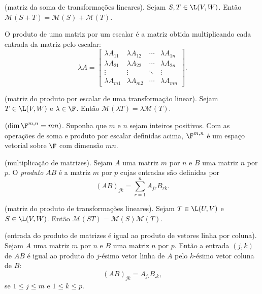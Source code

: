 \documentclass{article}
\begin{document}
\begin{prop} (matriz da soma de transformações lineares).
    Sejam \(S, T \in \L(V, W)\). Então \(\mathcal{M}(S + T) = \mathcal{M}(S) + \mathcal{M}(T)\).
\end{prop}

\begin{defn}
    O produto de uma matriz por um escalar é a matriz obtida multiplicando cada entrada da matriz pelo escalar:
    \[
        \lambda A = \begin{bmatrix}
            \lambda A_{11} & \lambda A_{12} & \cdots & \lambda A_{1n} \\
            \lambda A_{21} & \lambda A_{22} & \cdots & \lambda A_{2n} \\
            \vdots & \vdots & \ddots & \vdots \\
            \lambda A_{m1} & \lambda A_{m2} & \cdots & \lambda A_{mn}
        \end{bmatrix}.
    \]
\end{defn}

\begin{prop} (matriz do produto por escalar de uma transformação linear).
    Sejam \(T \in \L(V, W)\) e \(\lambda \in \F\). Então \(\mathcal{M}(\lambda T) = \lambda \mathcal{M}(T)\).
\end{prop}

\begin{prop} \((\dim \F^{m,n} = mn)\).
    Suponha que \(m\) e \(n\) sejam inteiros positivos. Com as operações de soma e produto por escalar definidas acima, \(\F^{m,n}\) é um espaço vetorial sobre \(\F\) com dimensão \(mn\).    
\end{prop}

\begin{defn} (multiplicação de matrizes).
    Sejam \(A\) uma matriz \(m\) por \(n\) e \(B\) uma matriz \(n\) por \(p\). O \emph{produto} \(AB\) é a matriz \(m\) por \(p\) cujas entradas são definidas por
    \[
        (AB)_{jk} = \sum_{r=1}^{n} A_{jr} B_{rk}.
    \]
\end{defn}

\begin{prop} (matriz do produto de transformações lineares).
    Sejam \(T \in \L(U, V)\) e \(S \in \L(V, W)\). Então \(\mathcal{M}(ST) = \mathcal{M}(S) \mathcal{M}(T)\).
\end{prop}

\begin{prop} (entrada do produto de matrizes é igual ao produto de vetores linha por coluna).
    Sejam \(A\) uma matriz \(m\) por \(n\) e \(B\) uma matriz \(n\) por \(p\). Então a entrada \((j, k)\) de \(AB\) é igual ao produto do \(j\)-ésimo vetor linha de \(A\) pelo \(k\)-ésimo vetor coluna de \(B\):
    \[
        (AB)_{jk} = A_{j.} B_{.k},
    \]
    \noindent se \(1 \leq j \leq m\) e \(1 \leq k \leq p\).
\end{prop}
\end{document}
